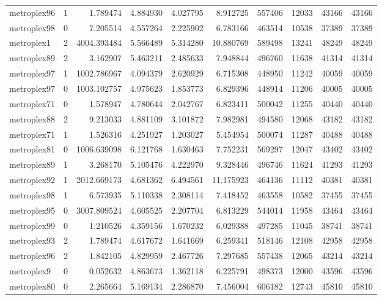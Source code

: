 \begin{longtable}{|l|r|r|r|r|r|r|r|r|r|}
metroplex96 & 1 & 1.789474 & 4.884930 & 4.027795 & 8.912725 & 557406 & 12033 & 43166 & 43166 \\
metroplex98 & 0 & 7.205514 & 4.557264 & 2.225902 & 6.783166 & 463514 & 10538 & 37389 & 37389 \\
metroplex1 & 2 & 4004.393484 & 5.566489 & 5.314280 & 10.880769 & 589498 & 13241 & 48249 & 48249 \\
metroplex89 & 2 & 3.162907 & 5.463211 & 2.485633 & 7.948844 & 496760 & 11638 & 41314 & 41314 \\
metroplex97 & 1 & 1002.786967 & 4.094379 & 2.620929 & 6.715308 & 448950 & 11242 & 40059 & 40059 \\
metroplex97 & 0 & 1003.102757 & 4.975623 & 1.853773 & 6.829396 & 448914 & 11206 & 40005 & 40005 \\
metroplex71 & 0 & 1.578947 & 4.780644 & 2.042767 & 6.823411 & 500042 & 11255 & 40440 & 40440 \\
metroplex88 & 2 & 9.213033 & 4.881109 & 3.101872 & 7.982981 & 494580 & 12068 & 43182 & 43182 \\
metroplex71 & 1 & 1.526316 & 4.251927 & 1.203027 & 5.454954 & 500074 & 11287 & 40488 & 40488 \\
metroplex81 & 0 & 1006.639098 & 6.121768 & 1.630463 & 7.752231 & 569297 & 12047 & 43402 & 43402 \\
metroplex89 & 1 & 3.268170 & 5.105476 & 4.222970 & 9.328446 & 496746 & 11624 & 41293 & 41293 \\
metroplex92 & 1 & 2012.669173 & 4.681362 & 6.494561 & 11.175923 & 464136 & 11112 & 40381 & 40381 \\
metroplex98 & 1 & 6.573935 & 5.110338 & 2.308114 & 7.418452 & 463558 & 10582 & 37455 & 37455 \\
metroplex95 & 0 & 3007.809524 & 4.605525 & 2.207704 & 6.813229 & 544014 & 11958 & 43464 & 43464 \\
metroplex99 & 0 & 1.210526 & 4.359156 & 1.670232 & 6.029388 & 497285 & 11045 & 38741 & 38741 \\
metroplex93 & 2 & 1.789474 & 4.617672 & 1.641669 & 6.259341 & 518146 & 12108 & 42958 & 42958 \\
metroplex96 & 2 & 1.842105 & 4.829959 & 2.467726 & 7.297685 & 557438 & 12065 & 43214 & 43214 \\
metroplex9 & 0 & 0.052632 & 4.863673 & 1.362118 & 6.225791 & 498373 & 12000 & 43596 & 43596 \\
metroplex80 & 0 & 2.265664 & 5.169134 & 2.286870 & 7.456004 & 606182 & 12743 & 45810 & 45810 \\

\end{longtable}
